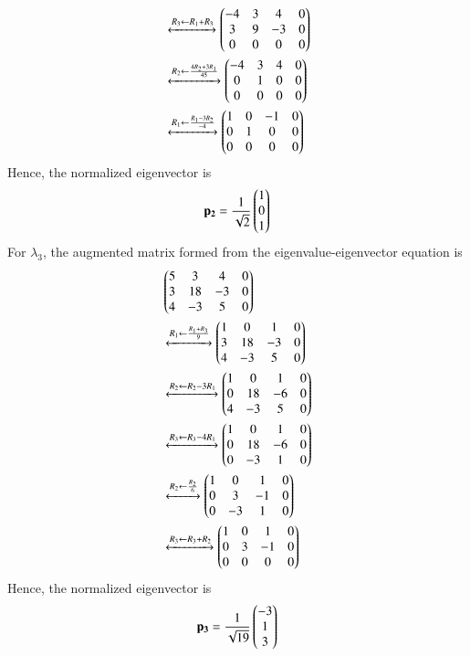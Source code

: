 \begin{enumerate}
\begin{align}
            &\xleftrightarrow[]{R_3 \leftarrow R_1+R_3} \begin{pmatrix}-4&3&4&0\\3&9&-3&0\\0&0&0&0\end{pmatrix} \\
            &\xleftrightarrow[]{R_2 \leftarrow \frac{4R_2+3R_1}{45}} \begin{pmatrix}-4&3&4&0\\0&1&0&0\\0&0&0&0\end{pmatrix} \\
            &\xleftrightarrow[]{R_1 \leftarrow \frac{R_1-3R_2}{-4}} \begin{pmatrix}1&0&-1&0\\0&1&0&0\\0&0&0&0\end{pmatrix}
        \end{align}
        Hence, the normalized eigenvector is
        \begin{align}
            \mathbf{p_2} = \frac{1}{\sqrt{2}}\begin{pmatrix}1\\0\\1\end{pmatrix}
        \end{align}
        For $\lambda_3$, the augmented matrix formed from the 
        eigenvalue-eigenvector equation is
        \begin{align}
            &\begin{pmatrix}5&3&4&0\\3&18&-3&0\\4&-3&5&0\end{pmatrix} \nonumber \\ 
            &\xleftrightarrow[]{R_1 \leftarrow \frac{R_1+R_3}{9}} \begin{pmatrix}1&0&1&0\\3&18&-3&0\\4&-3&5&0\end{pmatrix} \\
            &\xleftrightarrow[]{R_2 \leftarrow R_2-3R_1} \begin{pmatrix}1&0&1&0\\0&18&-6&0\\4&-3&5&0\end{pmatrix} \\
            &\xleftrightarrow[]{R_3 \leftarrow R_3-4R_1} \begin{pmatrix}1&0&1&0\\0&18&-6&0\\0&-3&1&0\end{pmatrix} \\
            &\xleftrightarrow[]{R_2 \leftarrow \frac{R_2}{6}} \begin{pmatrix}1&0&1&0\\0&3&-1&0\\0&-3&1&0\end{pmatrix} \\
            &\xleftrightarrow[]{R_3 \leftarrow R_3+R_2} \begin{pmatrix}1&0&1&0\\0&3&-1&0\\0&0&0&0\end{pmatrix}
        \end{align}
        Hence, the normalized eigenvector is
        \begin{align}
            \vec{p_3} = \frac{1}{\sqrt{19}}\myvec{-3\\1\\3}

\end{align}
\end{enumerate}
